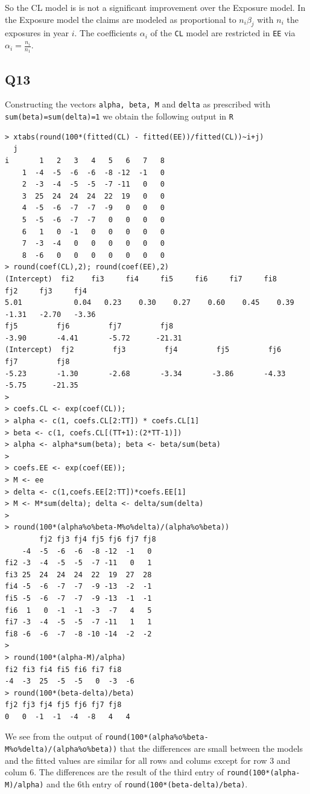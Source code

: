 \documentclass[11pt]{article}
\begin{document}
So the CL model is is not a significant improvement over the Exposure model. In the Exposure model the claims are modeled as proportional to $n_i \beta_j$ with $n_i$ the exposures in year $i$. The coefficients $\alpha_i$ of the \verb|CL| model are restricted in \verb|EE| via $\alpha_i = \frac{n_i}{n_1}$.

\subsection*{Q13}

Constructing the vectors \verb|alpha, beta, M| and \verb|delta| as prescribed with \verb|sum(beta)=sum(delta)=1| we obtain the following output in \verb|R|

\begin{verbatim}
> xtabs(round(100*(fitted(CL) - fitted(EE))/fitted(CL))~i+j)
  j
i       1   2   3   4   5   6   7   8
    1  -4  -5  -6  -6  -8 -12  -1   0
    2  -3  -4  -5  -5  -7 -11   0   0
    3  25  24  24  24  22  19   0   0
    4  -5  -6  -7  -7  -9   0   0   0
    5  -5  -6  -7  -7   0   0   0   0
    6   1   0  -1   0   0   0   0   0
    7  -3  -4   0   0   0   0   0   0
    8  -6   0   0   0   0   0   0   0
> round(coef(CL),2); round(coef(EE),2)
(Intercept)  fi2    fi3     fi4     fi5     fi6     fi7     fi8     fj2     fj3     fj4 
5.01	        0.04   0.23    0.30    0.27    0.60    0.45    0.39    -1.31   -2.70   -3.36 
fj5         fj6         fj7         fj8 
-3.90       -4.41       -5.72      -21.31 
(Intercept)  fj2         fj3         fj4         fj5         fj6         fj7         fj8 
-5.23       -1.30       -2.68       -3.34       -3.86       -4.33       -5.75      -21.35 
> 
> coefs.CL <- exp(coef(CL));
> alpha <- c(1, coefs.CL[2:TT]) * coefs.CL[1]
> beta <- c(1, coefs.CL[(TT+1):(2*TT-1)])
> alpha <- alpha*sum(beta); beta <- beta/sum(beta)
> 
> coefs.EE <- exp(coef(EE));
> M <- ee
> delta <- c(1,coefs.EE[2:TT])*coefs.EE[1]
> M <- M*sum(delta); delta <- delta/sum(delta)
> 
> round(100*(alpha%o%beta-M%o%delta)/(alpha%o%beta))
        fj2 fj3 fj4 fj5 fj6 fj7 fj8
    -4  -5  -6  -6  -8 -12  -1   0
fi2 -3  -4  -5  -5  -7 -11   0   1
fi3 25  24  24  24  22  19  27  28
fi4 -5  -6  -7  -7  -9 -13  -2  -1
fi5 -5  -6  -7  -7  -9 -13  -1  -1
fi6  1   0  -1  -1  -3  -7   4   5
fi7 -3  -4  -5  -5  -7 -11   1   1
fi8 -6  -6  -7  -8 -10 -14  -2  -2
> 
> round(100*(alpha-M)/alpha)
fi2 fi3 fi4 fi5 fi6 fi7 fi8 
-4  -3  25  -5  -5   0  -3  -6 
> round(100*(beta-delta)/beta)
fj2 fj3 fj4 fj5 fj6 fj7 fj8 
0   0  -1  -1  -4  -8   4   4 
\end{verbatim}
We see from the output of \verb|round(100*(alpha%o%beta-M%o%delta)/(alpha%o%beta))| that the differences are small between the models and the fitted values are similar for all rows and colums except for row 3 and colum 6. The differences are the result of the third entry of \verb|round(100*(alpha-M)/alpha)| and the 6th entry of \verb|round(100*(beta-delta)/beta)|.
\end{document}
